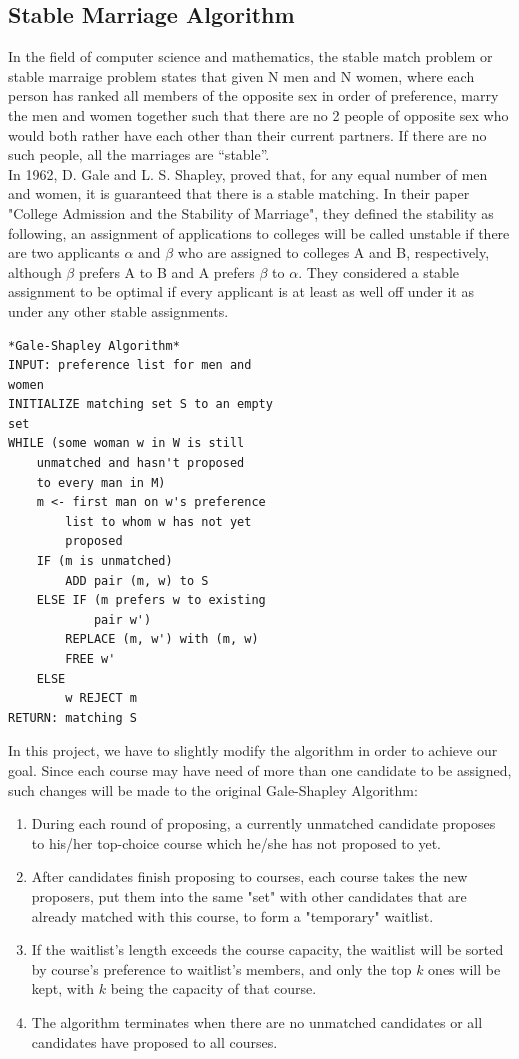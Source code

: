 \documentclass[twoside,twocolumn]{article}
\begin{document}
    \subsection{Stable Marriage Algorithm}
    \indent In the field of computer science and mathematics, the stable match problem or stable marraige problem states that given N men and N women, 
    where each person has ranked all members of the opposite sex in order of preference, marry the men and women together such that there are no 
    2 people of opposite sex who would both rather have each other than their current partners. If there are no such people, all the marriages are “stable”.
    \\ \indent In 1962, D. Gale and L. S. Shapley, proved that, for any equal number of men and women, it is guaranteed
    that there is a stable matching. In their paper "College Admission and the Stability of Marriage", they defined the stability as following, an assignment
    of applications to colleges will be called unstable if there are two applicants $\alpha$ and $\beta$ who are assigned to colleges A and B, respectively,
    although $\beta$ prefers A to B and A prefers $\beta$ to $\alpha$. They considered a stable assignment to be optimal if every applicant is at least 
    as well off under it as under any other stable assignments.
    \\ 
    \begin{lstlisting}
*Gale-Shapley Algorithm*
INPUT: preference list for men and 
women
INITIALIZE matching set S to an empty 
set
WHILE (some woman w in W is still 
    unmatched and hasn't proposed 
    to every man in M)
    m <- first man on w's preference 
        list to whom w has not yet 
        proposed
    IF (m is unmatched)
        ADD pair (m, w) to S
    ELSE IF (m prefers w to existing 
            pair w')
        REPLACE (m, w') with (m, w) 
        FREE w'
    ELSE 
        w REJECT m
RETURN: matching S
    \end{lstlisting}
    \indent In this project, we have to slightly modify the algorithm in order to achieve our goal. Since each course may have need 
    of more than one candidate to be assigned, such changes will be made to the original Gale-Shapley Algorithm:
    \begin{enumerate}
        \item During each round of proposing, a currently unmatched candidate proposes to his/her top-choice course which he/she 
        has not proposed to yet.
        \item After candidates finish proposing to courses, each course takes the new proposers, put them into the same "set" with
        other candidates that are already matched with this course, to form a "temporary" waitlist.
        \item If the waitlist's length exceeds the course capacity, the waitlist will be sorted by course's preference to waitlist's
        members, and only the top $k$ ones will be kept, with $k$ being the capacity of that course.
        \item The algorithm terminates when there are no unmatched candidates or all candidates have proposed to all courses.
    \end{enumerate}
\end{document}
